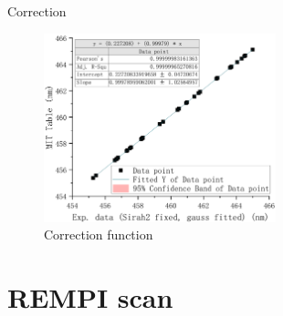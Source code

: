 \documentclass[aspectratio=43,scheme=plain]{ctexbeamer}
\begin{document}
	\begin{frame}{\insertsection}{Correction}
		\begin{figure}[H]
			\centering
			\includegraphics[width=0.6\textwidth]{fitfunc.pdf}
			\caption{Correction function}
		\end{figure}
	\end{frame}
\section{REMPI scan}
\end{document}
